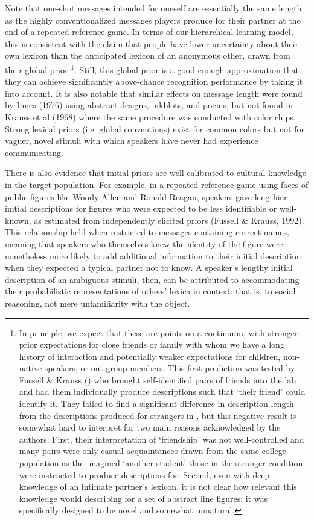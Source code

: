\documentclass[11pt, floatsintext, man]{apa6}
\begin{document}
Note that one-shot messages intended for oneself are essentially the same length as the highly conventionalized messages players produce for their partner at the end of a repeated reference game. In terms of our hierarchical learning model, this is consistent with the claim that people have lower uncertainty about their own lexicon than the anticipated lexicon of an anonymous other, drawn from their global prior
\footnote{In principle, we expect that these are points on a continuum, with stronger prior expectations for close friends or family with whom we have a long history of interaction and potentially weaker expectations for children, non-native speakers, or out-group members. This first prediction was tested by Fussell \& Krauss (\cite{FussellKrauss89_FriendsAndStrangers}) who brought self-identified pairs of friends into the lab and had them individually produce descriptions such that `their friend' could identify it. They failed to find a significant difference in description length from the descriptions produced for strangers in \cite{FussellKrauss89_IntendedAudienceCommonGround}, but this negative result is somewhat hard to interpret for two main reasons acknowledged by the authors. First, their interpretation of `friendship' was not well-controlled and many pairs were only casual acquaintances drawn from the same college population as the imagined `another student' those in the stranger condition were instructed to produce descriptions for. Second, even with deep knowledge of an intimate partner's lexicon, it is not clear how relevant this knowledge would describing for a set of abstract line figures: it was specifically designed to be novel and somewhat unnatural.
}. 
Still, this global prior is a good enough approximation that they can achieve significantly above-chance recognition performance by taking it into account. It is also notable that similar effects on message length were found by Innes (1976) using abstract designs, inkblots, and poems, but not found in Krauss et al (1968) where the same procedure was conducted with color chips. Strong lexical priors (i.e. global conventions) exist for common colors but not for vaguer, novel stimuli with which speakers have never had experience communicating. 

There is also evidence that initial priors are well-calibrated to cultural knowledge in the target population. For example, in a repeated reference game using faces of public figures like Woody Allen and Ronald Reagan, speakers gave lengthier initial descriptions for figures who were expected to be less identifiable or well-known, as estimated from independently elicited priors (Fussell \& Krauss, 1992). This relationship held when restricted to messages containing correct names, meaning that speakers who themselves knew the identity of the figure were nonetheless more likely to add additional information to their initial description when they expected a typical partner not to know. A speaker's lengthy initial description of an ambiguous stimuli, then, can be attributed to accommodating their probabilistic representations of others' lexica in context: that is, to social reasoning, not mere unfamiliarity with the object.
\end{document}
